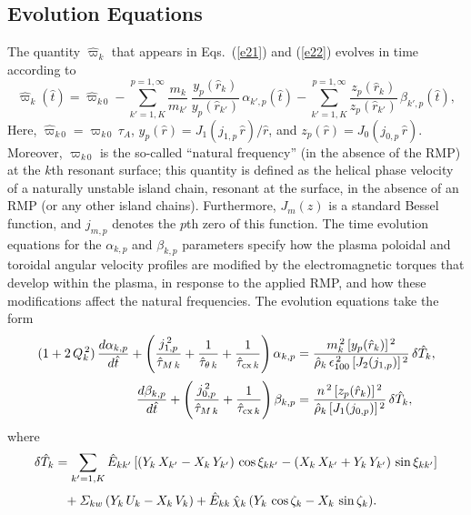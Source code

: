 \documentclass[notitlepage,12pt]{article}
\begin{document}
\subsection{Evolution Equations}
The quantity $\hat{\varpi}_k$ that appears in Eqs.~(\ref{e21}) and (\ref{e22}) evolves in time according to
\begin{equation}\label{e19a}
\hat{\varpi}_k(\hat{t})= \hat{\varpi}_{k\,0}-\sum_{k'=1,K}^{p=1,\infty} \frac{m_k}{m_{k'}}\,\frac{y_p(\hat{r}_k)}{y_p(\hat{r}_{k'})}\,\alpha_{k',p}(\hat{t})-\sum_{k'=1,K}^{p=1,\infty}\frac{z_p(\hat{r}_k)}{z_p(\hat{r}_{k'})}\,\beta_{k',p}(\hat{t}),
\end{equation}
Here, $\hat{\varpi}_{k\,0}= \varpi_{k\,0}\,\tau_A$, $y_p(\hat{r})=J_1(j_{1,p}\,\hat{r})/\hat{r}$, and $z_p(\hat{r})=J_0(j_{0,p}\,\hat{r})$. Moreover, $\varpi_{k\,0}$
is the so-called ``natural frequency''  (in the absence of the RMP) at the $k$th resonant surface; this quantity is defined as the helical phase velocity of a naturally unstable island chain, resonant at the surface, in the
absence of an RMP (or any other island chains). Furthermore, $J_m(z)$ is a standard Bessel function, and $j_{m,p}$ denotes the $p$th zero of this function. 
The time evolution equations for the $\alpha_{k,p}$ and $\beta_{k,p}$ parameters specify how the
plasma poloidal and toroidal angular velocity profiles are modified by the electromagnetic torques that develop within the plasma, in response to the applied
RMP, and how these modifications affect the natural frequencies. The evolution equations take the form
\begin{align}
(1+2\,Q_k^{\,2})\,\frac{d\alpha_{k,p}}{d\hat{t}}+ \left(\frac{j_{1,p}^{\,2}}{\hat{\tau}_{M\,k}}+\frac{1}{\hat{\tau}_{\theta\,k}}+\frac{1}{\hat{\tau}_{{\rm cx}\,k}}\right)\alpha_{k,p}&=
\frac{m_k^{\,2}\,[y_p(\hat{r}_k)]^{\,2}}{\hat{\rho}_k\,\epsilon_{100}^{\,2}\,[J_2(j_{1,p})]^{\,2}}\,\delta\hat{T}_k,\\[0.5ex]
\frac{d\beta_{k,p}}{d\hat{t}}+ \left(\frac{j_{0,p}^{\,2}}{\hat{\tau}_{M\,k}}+\frac{1}{\hat{\tau}_{{\rm cx}\,k}}\right)\beta_{k,p}&=
\frac{n^{\,2}\,[z_p(\hat{r}_k)]^{\,2}}{\hat{\rho}_k\,[J_1(j_{0,p})]^{\,2}}\,\delta\hat{T}_k,
\end{align}
where
\begin{align}\label{e24a}
\delta \hat{T}_k&= \sum_{k'=1,K}\hat{E}_{kk'}\left[(Y_k\,X_{k'}-X_k\,Y_{k'})\,\cos\xi_{kk'}- (X_k\,X_{k'}+Y_k\,Y_{k'})\,\sin\xi_{kk'}\right]\nonumber\\[0.5ex]
&\phantom{=}+{\mit\Sigma}_{kw}\,(Y_k\,U_k-X_k\,V_k)+\hat{E}_{kk}\,\hat{\chi}_k\,(Y_k\,\cos\zeta_k-X_k\,\sin\zeta_k).
\end{align}
\end{document}
